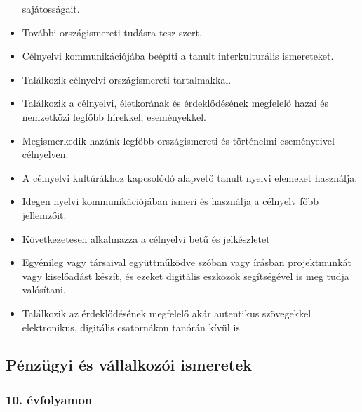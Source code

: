 \begin{itemize}
  sajátosságait.
\item
  További országismereti tudásra tesz szert.
\item
  Célnyelvi kommunikációjába beépíti a tanult interkulturális
  ismereteket.
\item
  Találkozik célnyelvi országismereti tartalmakkal.
\item
  Találkozik a célnyelvi, életkorának és érdeklődésének megfelelő hazai
  és nemzetközi legfőbb hírekkel, eseményekkel.
\item
  Megismerkedik hazánk legfőbb országismereti és történelmi eseményeivel
  célnyelven.
\item
  A célnyelvi kultúrákhoz kapcsolódó alapvető tanult nyelvi elemeket
  használja.
\item
  Idegen nyelvi kommunikációjában ismeri és használja a célnyelv főbb
  jellemzőit.
\item
  Következetesen alkalmazza a célnyelvi betű és jelkészletet
\item
  Egyénileg vagy társaival együttműködve szóban vagy írásban
  projektmunkát vagy kiselőadást készít, és ezeket digitális eszközök
  segítségével is meg tudja valósítani.
\item
  Találkozik az érdeklődésének megfelelő akár autentikus szövegekkel
  elektronikus, digitális csatornákon tanórán kívül is.
\end{itemize}

\hypertarget{penzugyi-es-vallalkozoi-ismeretek}{%
\subsection{Pénzügyi és vállalkozói
ismeretek}\label{penzugyi-es-vallalkozoi-ismeretek}}

\hypertarget{evfolyamon-7}{%
\subsubsection{10. évfolyamon}\label{evfolyamon-7}}

